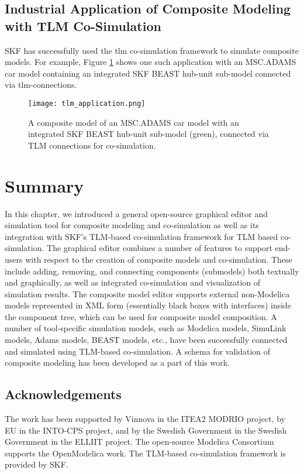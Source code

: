 \subsection{Industrial Application of Composite Modeling with TLM Co-Simulation}
\label{sec:tlmapplication}

SKF has successfully used the \acrshort{tlm} co-simulation framework to simulate composite models. For
example, Figure \ref{fig:tlmapplication} shows one such application with an MSC.ADAMS \cite{adams} car model
containing an integrated SKF BEAST \cite{beast} hub-unit sub-model 
connected via \acrshort{tlm}-connections.

\clearpage
\begin{figure} [!h]
	\texttt{[image: tlm\_application.png]}
	\caption{A composite model of an MSC.ADAMS car model with an integrated SKF BEAST hub-unit sub-model (green), connected 
		     via TLM connections for co-simulation.}
	\label{fig:tlmapplication}
\end{figure}

\section{Summary}
\label{sec:tlmsummary}

In this chapter, we introduced a general open-source graphical editor and simulation tool for composite modeling and co-simulation as well as its integration with SKF’s TLM-based co-simulation framework for TLM based co-simulation. The graphical editor combines a number of features to support end-users with respect to the creation of composite models and co-simulation. These include adding, removing, and connecting components (submodels) both textually and graphically, as well as integrated co-simulation and visualization of simulation results. The composite model editor supports external non-Modelica models represented in XML form (essentially black boxes with interfaces) inside the component tree, which can be used for composite model composition. A number of tool-specific simulation models, such as Modelica models, SimuLink models, Adams models, BEAST models,
etc., have been successfully connected and simulated using TLM-based co-simulation. A schema for validation of composite modeling has been developed as a part of this work. 

\subsection*{Acknowledgements}
\label{sec:tlmAcknowledgements}

The work has been supported by Vinnova in the ITEA2
MODRIO project, by EU in the INTO-CPS project, and by the Swedish Government in the Swedish
Government in the ELLIIT project. The open-source Modelica Consortium supports the OpenModelica
work. The TLM-based co-simulation framework is provided by SKF.





